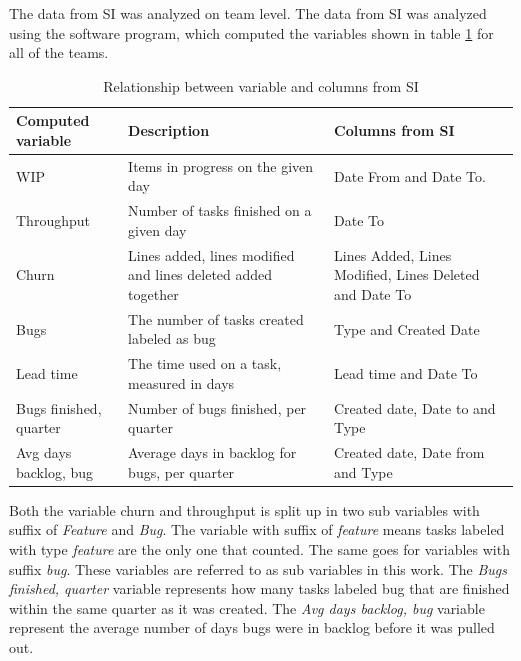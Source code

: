 \documentclass[UKenglish]{ifimaster}  %
\begin{document}
The data from SI was analyzed on team level. The data from SI was analyzed using the software program, which computed the variables shown in table \ref{des} for all of the teams.
\newpage
\begin{table}[htbp]
\begin{center}
    \begin{tabular}{| l | p{5cm} |  p{5cm} |}
    \hline
    \bf{Computed variable} &	\bf{Description}	 & \bf{Columns from SI}\\ \hline 
     WIP & \parbox[t]{5cm}{Items in progress on the given day} & Date From and Date To. \\ \hline
     Throughput	& Number of tasks finished on a given day & Date To \\ \hline
     Churn & Lines added, lines modified and lines deleted added together & Lines Added, Lines Modified, Lines Deleted and Date To \\ \hline
    Bugs & The number of tasks created labeled as bug & Type and Created Date \\ \hline
    Lead time & The time used on a task, measured in days & Lead time and Date To \\ \hline
    Bugs finished, quarter & Number of bugs finished, per quarter &Created date, Date to and Type \\ \hline
    Avg days backlog, bug & Average days in backlog for bugs, per quarter & Created date, Date from and Type \\ \hline
  \end{tabular}
\caption{Relationship between variable and columns from SI}
\label{des} %
\end{center}
\end{table}

 
Both the variable churn and throughput is split up in two sub variables with suffix of \textit{Feature} and \textit{Bug}. The variable with suffix of \textit{feature} means tasks labeled with type \textit{feature} are the only one that counted. The same goes for variables with suffix \textit{bug}. These variables are referred to as sub variables in this work.  The \textit{Bugs finished, quarter} variable represents how many tasks labeled bug that are finished within the same quarter as it was created.  The \textit{Avg days backlog, bug} variable represent the average number of days bugs were in backlog before it was pulled out. %
\end{document}
